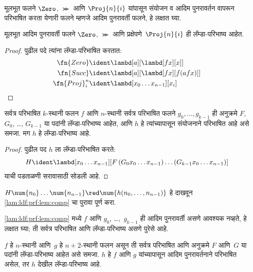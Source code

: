 मूलभूत फलने $\Zero$, $\Succ$ आणि $\Proj{n}{i}$
यांपासून संयोजन व आदिम पुनरावर्तन वापरून परिभाषित
करता येणारी फलने म्हणजे आदिम पुनरावर्ती फलने, हे लक्षात घ्या.

\begin{lem}
  \label{lam:ldf:prf:lem:basic}
  मूलभूत आदिम पुनरावर्ती फलने $\Zero$, $\Succ$ आणि
  प्रक्षेपणे~$\Proj{n}{i}$ ही लॅम्डा-परिभाष्य आहेत.
\end{lem}

\begin{proof}
पुढील पदे त्यांना लॅम्डा-परिभाषित करतात:
\begin{align*}
  \fn{Zero} & \ident \lambd[a][\lambd[fx][x]]\\
  \fn{Succ} & \ident \lambd[a][\lambd[fx][f (a f x)]] \\
  \fn{Proj}^n_i & \ident \lambd[x_0\dots x_{n-1}][x_i]
\end{align*}
\end{proof}

\begin{lem}
  \label{lam:ldf:prf:lem:comp} सर्वत्र परिभाषित $k$-स्थानी फलन $f$ आणि $n$-स्थानी
  सर्वत्र परिभाषित फलने $g_0, \dots, g_{k-1}$ ही अनुक्रमे $F$, $G_0$,
  \dots, $G_{k-1}$ या पदांनी लॅम्डा-परिभाष्य आहेत,
  आणि $h$ हे त्यांच्यापासून संयोजनाने परिभाषित आहे असे समजा.
  मग $h$ हे लॅम्डा-परिभाष्य आहे.
\end{lem}

\begin{proof}
  पुढील पद $h$ ला लॅम्डा-परिभाषित करते:
  \[  H \ident \lambd[x_0 \dots x_{n-1}][F\, (G_0 x_0 \dots
    x_{n-1}) \dots (G_{k-1} x_0 \dots x_{n-1})]
  \]
  याची पडताळणी सरावासाठी सोडली आहे.
\end{proof}

\begin{prob}
  $H\num{n_0}\dots\num{n_{n-1}} \red \num{h(n_0, \dots,
    n_{n-1})}$ हे दाखवून \ref{lam:ldf:prf:lem:comp}
  चा पुरावा पूर्ण करा.
\end{prob}

\ref{lam:ldf:prf:lem:comp} मध्ये $f$ आणि $g_0$,
\dots,~$g_{k-1}$ ही आदिम पुनरावर्ती असणे आवश्यक
नव्हते, हे लक्षात घ्या; ती सर्वत्र परिभाषित आणि
लॅम्डा-परिभाष्य असणे पुरेसे आहे.

\begin{lem}\label{lam:ldf:prf:lem:prim}
  $f$ हे $n$-स्थानी आणि~$g$ हे $n+2$-स्थानी फलन
  असून ती सर्वत्र परिभाषित आणि अनुक्रमे $F$ आणि~$G$ या पदांनी
  लॅम्डा-परिभाष्य आहेत असे समजा. $h$ हे
  $f$ आणि $g$ यांच्यापासून आदिम पुनरावर्तनाने परिभाषित असेल,
  तर $h$ देखील लॅम्डा-परिभाष्य आहे.
\end{lem}

